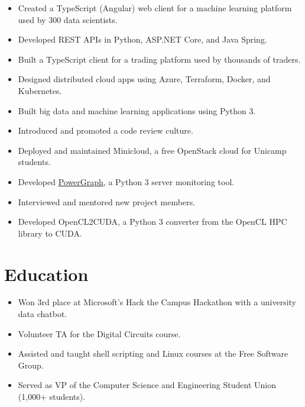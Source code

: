 \documentclass[10pt, a4paper, roman]{moderncv} %
\begin{document}
{
    \begin{itemize}
        \item Created a TypeScript (Angular) web client for a machine learning platform used by 300 data scientists.
        \item Developed REST APIs in Python, ASP.NET Core, and Java Spring.
        \item Built a TypeScript client for a trading platform used by thousands of traders.
	    \item Designed distributed cloud apps using Azure, Terraform, Docker, and Kubernetes.
    \end{itemize}
}

{
    \begin{itemize}
        \item Built big data and machine learning applications using Python 3.
        \item Introduced and promoted a code review culture.
    \end{itemize}
}

{
    \begin{itemize}
        \item Deployed and maintained Minicloud, a free OpenStack cloud for Unicamp students.
        \item Developed \href{https://github.com/Guilhermeslucas/powergraph}{PowerGraph}, a Python 3 server monitoring tool.
        \item Interviewed and mentored new project members.
        \item Developed OpenCL2CUDA, a Python 3 converter from the OpenCL HPC library to CUDA.
    \end{itemize}
}

\section{Education}

{
    \begin{itemize}
        \item Won 3rd place at Microsoft's Hack the Campus Hackathon with a university data chatbot.
        \item Volunteer TA for the Digital Circuits course.
        \item Assisted and taught shell scripting and Linux courses at the Free Software Group.
        \item Served as VP of the Computer Science and Engineering Student Union (1,000+ students).
    \end{itemize} 
}
\end{document}
